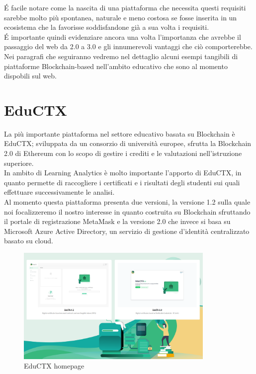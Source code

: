 \vspace{1em}
\'E facile notare come la nascita di una piattaforma che necessita questi requisiti sarebbe molto più spontanea, naturale e meno costosa se 
fosse inserita in un ecosistema che la favorisse soddisfandone già a sua volta i requisiti.
\\\'E importante quindi evidenziare ancora una volta l'importanza che avrebbe il passaggio del web da 2.0 a 3.0 e gli innumerevoli vantaggi che ciò comporterebbe.
\\Nei paragrafi che seguiranno vedremo nel dettaglio alcuni esempi tangibili di piattaforme Blockchain-based nell'ambito educativo che sono al momento dispobili sul web.

\newpage
\section{EduCTX}
La più importante piattaforma nel settore educativo basata su Blockchain è EduCTX; sviluppata da un consorzio di università europee, sfrutta la Blockchain 2.0 di Ethereum con lo scopo di gestire i crediti e le valutazioni nell'istruzione superiore.
\\In ambito di Learning Analytics è molto importante l'apporto di EduCTX, in quanto permette di raccogliere i certificati e i risultati degli studenti sui quali effettuare successivamente le analisi.
\\Al momento questa piattaforma presenta due versioni, la versione 1.2 sulla quale noi focalizzeremo il nostro interesse in quanto costruita su Blockchain
sfruttando il portale di registrazione MetaMask e la versione 2.0 che invece si basa su Microsoft Azure Active Directory, un servizio di gestione d'identità centralizzato basato su cloud.
\begin{figure}[h]
    \centering
    \includegraphics[width=0.85\textwidth]{Immagini/EduCTX.PNG}
    \caption{EduCTX homepage}
\end{figure}

